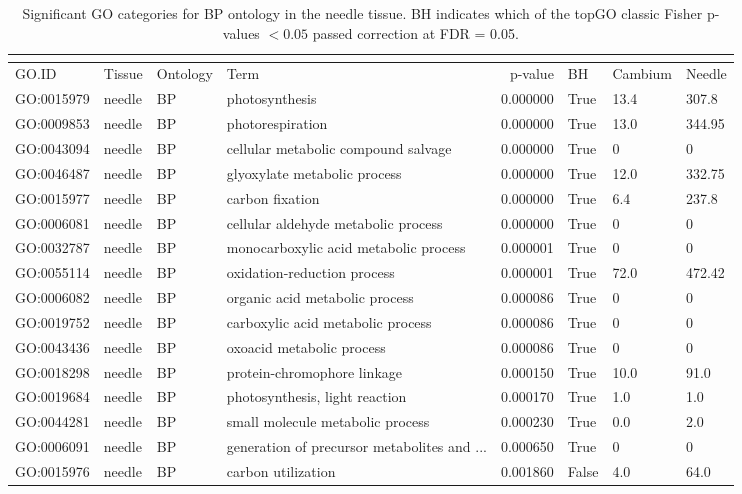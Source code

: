 \begin{longtable}{llllrl}
\caption{Significant GO categories for BP ontology in the needle tissue. BH indicates which of the topGO classic Fisher p-values $< 0.05$ passed correction at FDR = 0.05.}\\
\label{tab:go-needle-BP}\\
\toprule
GO.ID & Tissue & Ontology & Term & p-value & BH & Cambium & Needle \\
\midrule
GO:0015979 & needle & BP &   photosynthesis  & 0.000000 &   True  & 13.4 & 307.8 \\ 
GO:0009853 & needle & BP &   photorespiration  & 0.000000 &   True  & 13.0 & 344.95 \\ 
GO:0043094 & needle & BP &   cellular metabolic compound salvage  & 0.000000 &   True  & 0 & 0 \\
GO:0046487 & needle & BP &   glyoxylate metabolic process  & 0.000000 &   True  & 12.0 & 332.75 \\ 
GO:0015977 & needle & BP &   carbon fixation  & 0.000000 &   True  & 6.4 & 237.8 \\ 
GO:0006081 & needle & BP &   cellular aldehyde metabolic process  & 0.000000 &   True  & 0 & 0 \\
GO:0032787 & needle & BP &   monocarboxylic acid metabolic process  & 0.000001 &   True  & 0 & 0 \\
GO:0055114 & needle & BP &   oxidation-reduction process  & 0.000001 &   True  & 72.0 & 472.42 \\ 
GO:0006082 & needle & BP &   organic acid metabolic process  & 0.000086 &   True  & 0 & 0 \\
GO:0019752 & needle & BP &   carboxylic acid metabolic process  & 0.000086 &   True  & 0 & 0 \\
GO:0043436 & needle & BP &   oxoacid metabolic process  & 0.000086 &   True  & 0 & 0 \\
GO:0018298 & needle & BP &   protein-chromophore linkage  & 0.000150 &   True  & 10.0 & 91.0 \\ 
GO:0019684 & needle & BP &   photosynthesis, light reaction  & 0.000170 &   True  & 1.0 & 1.0 \\ 
GO:0044281 & needle & BP &   small molecule metabolic process  & 0.000230 &   True  & 0.0 & 2.0 \\ 
GO:0006091 & needle & BP &   generation of precursor metabolites and ...  & 0.000650 &   True  & 0 & 0 \\
GO:0015976 & needle & BP &   carbon utilization  & 0.001860 &   False  & 4.0 & 64.0 \\ 

\end{longtable}
